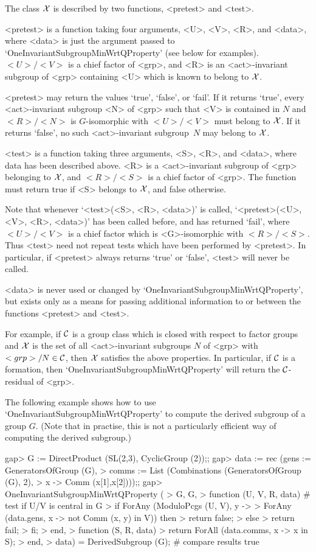 The class $\cal X$ is described by two functions, <pretest> and <test>. 

<pretest> is a function taking four arguments, <U>, <V>, <R>, and <data>,
where <data> is just the argument passed to
`OneInvariantSubgroupMinWrtQProperty' (see below for examples). $<U>/<V>$ is a
chief factor of <grp>, and  <R> is an <act>-invariant subgroup of <grp> containing <U>
which is known to belong to
$\cal X$.

<pretest> may return the values `true', `false', or `fail'. If it returns 
`true', every <act>-invariant subgroup <N> of <grp> such that <V> is
contained in $N$ and $<R>/<N>$ is
$G$-isomorphic with $<U>/<V>$ must belong to $\cal X$. If it returns
`false', no such <act>-invariant subgroup~$N$ may belong to $\cal X$. 

<test> is a function taking three arguments, <S>, <R>, and <data>, where
data has been described above. <R> is a <act>-invariant subgroup of <grp> belonging to
$\cal X$, and $<R>/<S>$ is a chief factor of <grp>. The function must return
true if <S> belongs to $\cal X$, and false otherwise. 

Note that whenever `<test>(<S>, <R>, <data>)' is called, 
`<pretest>(<U>, <V>, <R>, <data>)' has been called before, and has returned
`fail', where  $<U>/<V>$ is a  chief factor which is <G>-isomorphic with
$<R>/<S>$. Thus <test> need not repeat tests which have been performed by
<pretest>. In particular, if <pretest> always returns `true' or `false',
<test> will never be called.

<data> is never used or changed by `OneInvariantSubgroupMinWrtQProperty', but
exists only as a means for passing additional information to or between
the functions <pretest> and <test>.

For example, if $\cal C$ is a group class which is closed with respect to
factor groups and $\cal X$ is the set of all <act>-invariant subgroups $N$ of <grp>
with $<grp>/N \in \cal C$, then $\cal X$ satisfies the above properties. In
particular, if $\cal C$ is a formation, then
`OneInvariantSubgroupMinWrtQProperty' will return the $\cal C$-residual of
<grp>.

The following example shows how to use `OneInvariantSubgroupMinWrtQProperty' to
compute the derived subgroup of a group $G$. (Note that in practise, this 
is not a particularly efficient way of computing the derived subgroup.)

\beginexample
gap> G := DirectProduct (SL(2,3), CyclicGroup (2));;
gap> data := rec (gens := GeneratorsOfGroup (G),
>    comms := List (Combinations (GeneratorsOfGroup (G), 2), 
>       x -> Comm (x[1],x[2])));;
gap> OneInvariantSubgroupMinWrtQProperty (
>    G, G,
>    function (U, V, R, data) # test if U/V is central in G
>        if ForAny (ModuloPcgs (U, V), y ->
>           ForAny (data.gens, x -> not Comm (x, y) in V)) then 
>           return false;
>        else
>           return fail;
>        fi;
>     end,
>     function (S, R, data)
>        return ForAll (data.comms, x -> x in S);
>     end,
>     data) = DerivedSubgroup (G); # compare results
true
\endexample       


